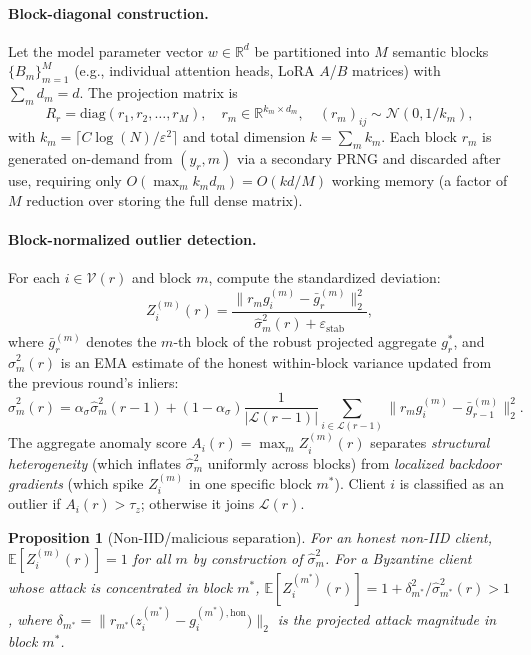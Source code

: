 \documentclass{article}
\newtheorem{proposition}[theorem]{Proposition}
\newcommand{\R}{\mathbb{R}}
\newcommand{\E}{\mathbb{E}}
\newcommand{\calV}{\mathcal{V}}      %
\newcommand{\calL}{\mathcal{L}}      %
\newcommand{\gstar}{g^{*}}           %
\begin{document}
\paragraph{Block-diagonal construction.}
Let the model parameter vector $w \in \R^d$ be partitioned into $M$ semantic
blocks $\{B_m\}_{m=1}^M$ (e.g., individual attention heads, LoRA $A$/$B$
matrices) with $\sum_m d_m = d$.
The projection matrix is
\[
  R_r = \mathrm{diag}(r_1, r_2, \ldots, r_M),
  \quad
  r_m \in \R^{k_m \times d_m},
  \quad
  (r_m)_{ij} \sim \mathcal{N}(0, 1/k_m),
\]
with $k_m = \lceil C \log(N)/\varepsilon^2 \rceil$ and total dimension
$k = \sum_m k_m$.
Each block $r_m$ is generated on-demand from $(y_r, m)$ via a secondary PRNG
and discarded after use, requiring only $O(\max_m k_m d_m) = O(kd/M)$ working
memory (a factor of $M$ reduction over storing the full dense matrix).

\paragraph{Block-normalized outlier detection.}
For each $i \in \calV(r)$ and block $m$, compute the standardized deviation:
\[
  Z_i^{(m)}(r) = \frac{\bigl\lVert r_m g_i^{(m)} - \bar{g}_r^{(m)}\bigr\rVert_2^2}
                      {\hat{\sigma}_m^2(r) + \varepsilon_{\mathrm{stab}}},
\]
where $\bar{g}_r^{(m)}$ denotes the $m$-th block of the robust projected
aggregate $\gstar_r$, and $\hat{\sigma}_m^2(r)$ is an EMA estimate of the
honest within-block variance updated from the previous round's inliers:
\[
  \hat{\sigma}_m^2(r)
  = \alpha_\sigma \hat{\sigma}_m^2(r{-}1)
  + (1{-}\alpha_\sigma)
    \frac{1}{|\calL(r{-}1)|} \sum_{i \in \calL(r{-}1)}
    \bigl\lVert r_m g_i^{(m)} - \bar{g}_{r-1}^{(m)}\bigr\rVert_2^2.
\]
The aggregate anomaly score $A_i(r) = \max_m Z_i^{(m)}(r)$ separates
\emph{structural heterogeneity} (which inflates $\hat\sigma_m^2$ uniformly
across blocks) from \emph{localized backdoor gradients} (which spike
$Z_i^{(m)}$ in one specific block $m^*$).
Client $i$ is classified as an outlier if $A_i(r) > \tau_z$; otherwise it
joins $\calL(r)$.

\begin{proposition}[Non-IID/malicious separation]
\label{prop:separation}
For an honest non-IID client, $\E[Z_i^{(m)}(r)] = 1$ for all $m$ by
construction of $\hat\sigma_m^2$.
For a Byzantine client whose attack is concentrated in block $m^*$,
$\E[Z_i^{(m^*)}(r)] = 1 + \delta_{m^*}^2 / \hat\sigma_{m^*}^2(r) > 1$,
where $\delta_{m^*} = \bigl\lVert r_{m^*}\bigl(z_i^{(m^*)} -
g_i^{(m^*),\mathrm{hon}}\bigr)\bigr\rVert_2$
is the projected attack magnitude in block $m^*$.
\end{proposition}
\end{document}
